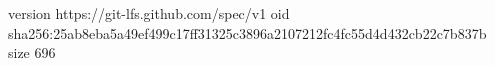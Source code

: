 version https://git-lfs.github.com/spec/v1
oid sha256:25ab8eba5a49ef499c17ff31325c3896a2107212fc4fc55d4d432cb22c7b837b
size 696

